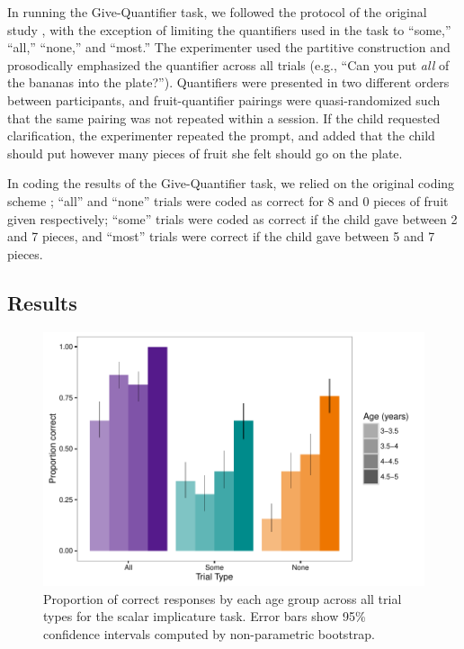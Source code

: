 \documentclass[man]{apa2}
\begin{document}
In running the Give-Quantifier task, we followed the protocol of the original study \cite{barner2009}, with the exception of limiting the quantifiers used in the task to ``some,'' ``all,'' ``none,'' and ``most.'' The experimenter used the partitive construction and prosodically emphasized the quantifier across all trials (e.g., ``Can you put \textit{all} of the bananas into the plate?''). Quantifiers were presented in two different orders between participants, and fruit-quantifier pairings were quasi-randomized such that the same pairing was not repeated within a session. If the child requested clarification, the experimenter repeated the prompt, and added that the child should put however many pieces of fruit she felt should go on the plate.

In coding the results of the Give-Quantifier task, we relied on the original coding scheme \cite{barner2009}; ``all'' and ``none'' trials were coded as correct for 8 and 0 pieces of fruit given respectively; ``some'' trials were coded as correct if the child gave between 2 and 7 pieces, and ``most'' trials were correct if the child gave between 5 and 7 pieces.

\subsection{Results}

\begin{figure}
 \begin{center}
  \includegraphics[width=6in]{figures/exp3_SIperformance.pdf}
  \caption{\label{fig:exp3_perf} Proportion of correct responses by each age group across all trial types for the scalar implicature task. Error bars show 95\% confidence intervals computed by non-parametric bootstrap.}
 \end{center}
\end{figure}
\end{document}
